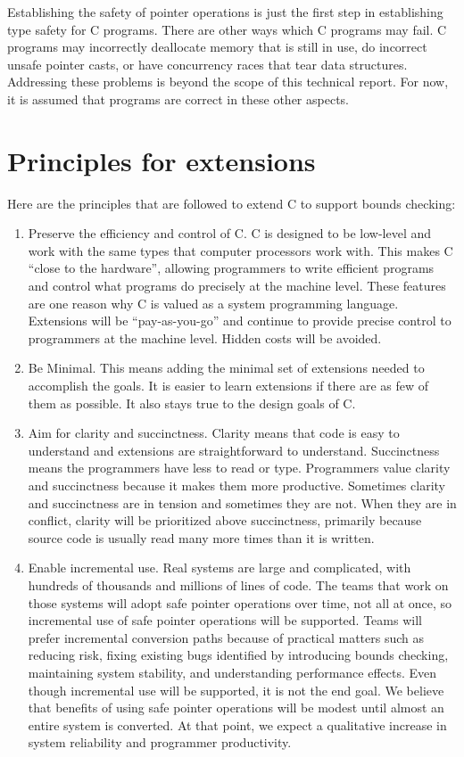 Establishing the safety of pointer operations is just the first step in
establishing type safety for C programs. There are other ways which C
programs may fail. C programs may incorrectly deallocate memory that is
still in use, do incorrect unsafe pointer casts, or have concurrency
races that tear data structures. Addressing these problems is beyond the
scope of this technical report. For now, it is assumed that programs are
correct in these other aspects.

\section{Principles for extensions}
\label{chapter:principles}

Here are the principles that are followed to extend C to support bounds checking:

\begin{enumerate}
\item
  Preserve the efficiency and control of C. C is designed to be
  low-level and work with the same types that computer processors work
  with. This makes C ``close to the hardware'', allowing programmers to
  write efficient programs and control what programs do precisely at the
  machine level. These features are one reason why C is valued as a
  system programming language. Extensions will be ``pay-as-you-go'' and
  continue to provide precise control to programmers at the machine
  level. Hidden costs will be avoided.
\item
  Be Minimal. This means adding the minimal set of extensions needed to
  accomplish the goals. It is easier to learn extensions if there are as
  few of them as possible. It also stays true to the design goals
  of C.
\item
  Aim for clarity and succinctness. Clarity means that code is easy to
  understand and extensions are straightforward to understand.
  Succinctness means the programmers have less to read or type.
  Programmers value clarity and succinctness because it makes them more
  productive.  Sometimes clarity and succinctness are in
  tension and sometimes they are not. When they are in conflict, clarity
  will be prioritized above succinctness, primarily because source code
  is usually read many more times than it is written.
\item
  Enable incremental use. Real systems are large and complicated, with
  hundreds of thousands and millions of lines of code. The teams that
  work on those systems will adopt safe pointer operations over time,
  not all at once, so incremental use of safe pointer operations will be
  supported. Teams will prefer incremental conversion paths because of
  practical matters such as reducing risk, fixing existing bugs
  identified by introducing bounds checking, maintaining system
  stability, and understanding performance effects. Even though
  incremental use will be supported, it is not the end goal. We believe
  that benefits of using safe pointer operations will be modest until
  almost an entire system is converted. At that point, we expect a
  qualitative increase in system reliability and programmer
  productivity.
\end{enumerate}

